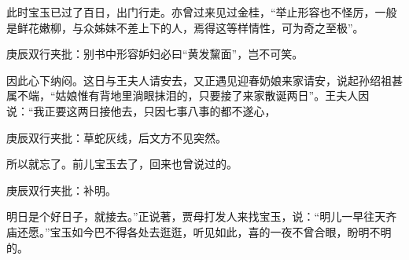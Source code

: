 \begin{parag}


    此时宝玉已过了百日，出门行走。亦曾过来见过金桂，“举止形容也不怪厉，一般是鲜花嫩柳，与众姊妹不差上下的人，焉得这等样情性，可为奇之至极”。\begin{note}庚辰双行夹批：别书中形容妒妇必曰“黄发黧面”，岂不可笑。\end{note}因此心下纳闷。这日与王夫人请安去，又正遇见迎春奶娘来家请安，说起孙绍祖甚属不端，“姑娘惟有背地里淌眼抹泪的，只要接了来家散诞两日”。王夫人因说：“我正要这两日接他去，只因七事八事的都不遂心，\begin{note}庚辰双行夹批：草蛇灰线，后文方不见突然。\end{note}所以就忘了。前儿宝玉去了，回来也曾说过的。\begin{note}庚辰双行夹批：补明。\end{note}明日是个好日子，就接去。”正说著，贾母打发人来找宝玉，说：“明儿一早往天齐庙还愿。”宝玉如今巴不得各处去逛逛，听见如此，喜的一夜不曾合眼，盼明不明的。
\end{parag}


